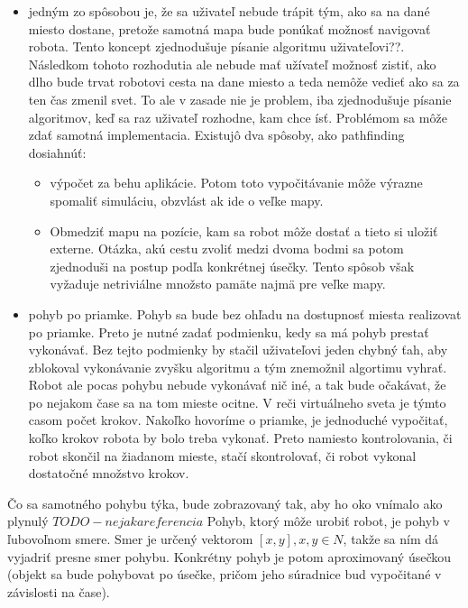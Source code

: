 \begin{itemize} %
\item jedným zo spôsobou je, že sa uživateľ nebude trápit tým, ako sa na dané miesto dostane, pretože samotná mapa bude ponúkať  možnosť navigovať robota. Tento koncept zjednodušuje písanie algoritmu uživateľovi??. Následkom tohoto rozhodutia ale nebude mať užívateľ možnosť zistiť, ako dlho bude trvat robotovi  cesta na dane miesto a teda nemôže vedieť ako sa za ten čas zmenil svet. To ale v zasade nie je problem, iba zjednodušuje písanie algoritmov, keď sa raz uživateľ rozhodne, kam chce ísť. Problémom sa môže zdať samotná implementacia. Existujô dva spôsoby, ako pathfinding dosiahnúť:
\begin{itemize}
\item výpočet za behu aplikácie. Potom toto vypočitávanie môže výrazne spomaliť simuláciu, obzvlást ak ide o veľke mapy.
\item Obmedziť mapu na pozície, kam sa robot môže dostať a tieto si uložiť externe. Otázka, akú cestu zvoliť  medzi dvoma bodmi sa potom zjednoduši na postup podľa konkrétnej úsečky. Tento spôsob však vyžaduje netriviálne množsto pamäte najmä pre veľke mapy.%
\end{itemize}

\item pohyb po priamke. Pohyb sa bude bez ohľadu na dostupnosť miesta realizovat po priamke. Preto je nutné zadať podmienku, kedy sa má pohyb prestať vykonávať. Bez tejto podmienky by stačil uživateľovi jeden chybný ťah, aby zblokoval vykonávanie zvyšku algoritmu a tým znemožnil algortimu vyhrať. Robot ale pocas pohybu nebude vykonávať nič iné, a tak bude očakávat, že po nejakom čase sa na tom mieste ocitne. V reči virtuálneho sveta je týmto casom počet krokov. Nakoľko hovoríme o priamke, je jednoduché vypočitať, koľko krokov robota  by bolo treba vykonať. Preto namiesto kontrolovania, či robot skončil na žiadanom mieste, stačí skontrolovať, či robot vykonal dostatočné množstvo krokov. 
\end{itemize}
Čo sa samotného pohybu týka, bude zobrazovaný tak, aby ho oko vnímalo ako plynulý $TODO-nejaka referencia$
Pohyb, ktorý môže urobiť robot, je pohyb v ľubovoľnom smere. Smer je určený vektorom $[x,y], x,y \in N $, takže sa ním dá vyjadriť presne smer pohybu. Konkrétny pohyb je potom aproximovaný úsečkou (objekt sa bude pohybovat po úsečke, pričom jeho súradnice bud vypočitané v závislosti na čase). %
